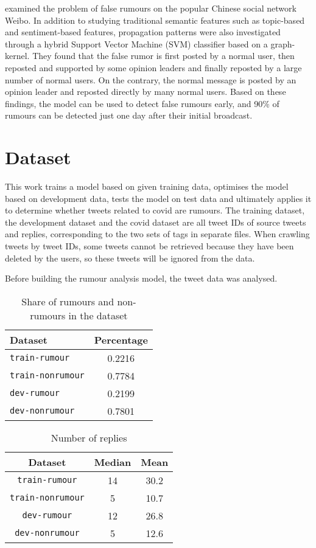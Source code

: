 \documentclass[11pt, a4paper]{article}
\begin{document}
\citet{wu20152} examined the problem of false rumours on the popular Chinese social network Weibo. In addition to studying traditional semantic features such as topic-based and sentiment-based features, propagation patterns were also investigated through a hybrid Support Vector Machine (SVM) classifier based on a graph-kernel. They found that the false rumor is first posted by a normal user, then reposted and supported by some opinion leaders and finally reposted by a large number of normal users. On the contrary, the normal message is posted by an opinion leader and reposted directly by many normal users. Based on these findings, the model can be used to detect false rumours early, and 90\% of rumours can be detected just one day after their initial broadcast.

\section{Dataset}

This work trains a model based on given training data, optimises the model based on development data, tests the model on test data and ultimately applies it to determine whether tweets related to covid are rumours. The training dataset, the development dataset and the covid dataset are all tweet IDs of source tweets and replies, corresponding to the two sets of tags in separate files. When crawling tweets by tweet IDs, some tweets cannot be retrieved because they have been deleted by the users, so these tweets will be ignored from the data.

Before building the rumour analysis model, the tweet data was analysed. 

\begin{table}[]
    \centering
    \begin{tabular}{lc}
        \hline
        \textbf{Dataset} & \textbf{Percentage}\\
        \hline
        \verb|train-rumour| & 0.2216 \\
        \verb|train-nonrumour| & 0.7784 \\
        \verb|dev-rumour| & 0.2199 \\
        \verb|dev-nonrumour| & 0.7801 \\
        \hline
    \end{tabular}
    \caption{Share of rumours and non-rumours in the dataset}
    \label{tab:my_label}
\end{table}

\begin{table}[]
    \centering
    \begin{tabular}{ccc}
        \hline
        \textbf{Dataset} & \textbf{Median} & \textbf{Mean}\\
        \hline
        \verb|train-rumour| & 14 & 30.2 \\
        \verb|train-nonrumour| & 5 & 10.7 \\
        \verb|dev-rumour| & 12 & 26.8 \\
        \verb|dev-nonrumour| & 5 & 12.6 \\
        \hline
    \end{tabular}
    \caption{Number of replies}
    \label{tab:my_label}
\end{table}
\end{document}
